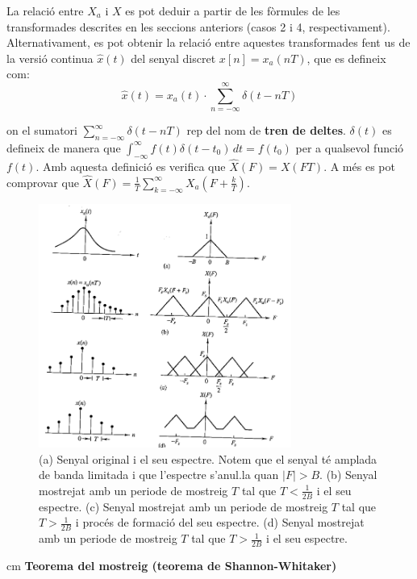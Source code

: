 \documentclass{article}
\begin{document}
\vskip 0.2cm
\noindent
La relaci\'o entre $X_a$ i $X$ es pot deduir a partir de les f\`ormules de les transformades descrites en les
seccions anteriors (casos 2 i 4, respectivament). Alternativament, es pot obtenir la relaci\'o entre
aquestes transformades fent us de la versi\'o continua $\hat{x}(t)$ del senyal discret $x[n]=x_a(nT)$, que es
defineix com:
\[
\hat{x}(t)=x_a(t) \cdot \sum_{n=-\infty}^\infty \delta(t-nT)
\]

\noindent
on el sumatori $\sum_{n=-\infty}^\infty \delta(t-nT)$ rep del nom de \textbf{tren de deltes}. $\delta(t)$
es defineix de manera que $\int_{-\infty}^\infty f(t) \delta(t-t_0) \, dt = f(t_0)$ per a qualsevol funci\'o $f(t)$.
Amb aquesta definici\'o es verifica que $\hat{X}(F)=X(FT)$. A m\'es es pot comprovar que $\hat{X}(F)=\frac{1}{T} \sum_{k=-\infty}^\infty X_a(F+\frac{k}{T})$.

\begin{figure}[htbp]
\begin{center}
\includegraphics[height=8cm]{exmostreig.png}
\end{center}
\caption{(a) Senyal original i el seu espectre. Notem que el senyal t\'e amplada de banda limitada i que l'espectre
s'anul.la quan $|F|>B$. (b) Senyal mostrejat amb un periode de mostreig $T$ tal que $T < \frac{1}{2B}$ i el seu espectre.
(c) Senyal mostrejat amb un periode de mostreig $T$ tal que $T > \frac{1}{2B}$ i proc\'es de formaci\'o del seu espectre.
(d) Senyal mostrejat amb un periode de mostreig $T$ tal que $T > \frac{1}{2B}$ i el seu espectre.}
\label{exmostreig}
\end{figure}

 cm
\noindent
\textbf{Teorema del mostreig (teorema de Shannon-Whitaker)}
\end{document}
